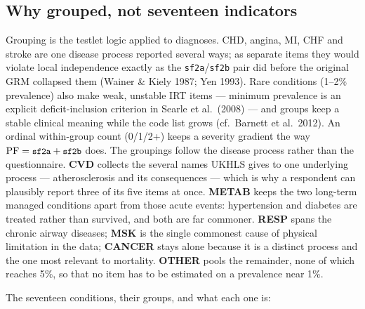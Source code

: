\documentclass[11pt]{article}
\newcommand{\code}[1]{\texttt{\small #1}}
\begin{document}
\subsection{Why grouped, not seventeen indicators}
\label{sec:groups}
Grouping is the testlet logic applied to diagnoses. CHD, angina, MI, CHF and
stroke are one disease process reported several ways; as separate items they
would violate local independence exactly as the \code{sf2a}/\code{sf2b} pair
did before the original GRM collapsed them (Wainer \& Kiely 1987; Yen 1993).
Rare conditions (1--2\% prevalence) also make weak, unstable IRT items ---
minimum prevalence is an explicit deficit-inclusion criterion in Searle et
al.\ (2008) --- and groups keep a stable clinical meaning while the code list
grows (cf.\ Barnett et al.\ 2012). An ordinal within-group count (0/1/2+)
keeps a severity gradient the way $\mathrm{PF}=\code{sf2a}+\code{sf2b}$ does.
The groupings follow the disease process rather than the questionnaire.
\textbf{CVD} collects the several names UKHLS gives to one underlying
process --- atherosclerosis and its consequences --- which is why a
respondent can plausibly report three of its five items at once.
\textbf{METAB} keeps the two long-term managed conditions apart from those
acute events: hypertension and diabetes are treated rather than survived, and
both are far commoner. \textbf{RESP} spans the chronic airway diseases;
\textbf{MSK} is the single commonest cause of physical limitation in the
data; \textbf{CANCER} stays alone because it is a distinct process and the
one most relevant to mortality. \textbf{OTHER} pools the remainder, none of
which reaches 5\%, so that no item has to be estimated on a prevalence near
1\%.

The seventeen conditions, their groups, and what each one is:
\end{document}
